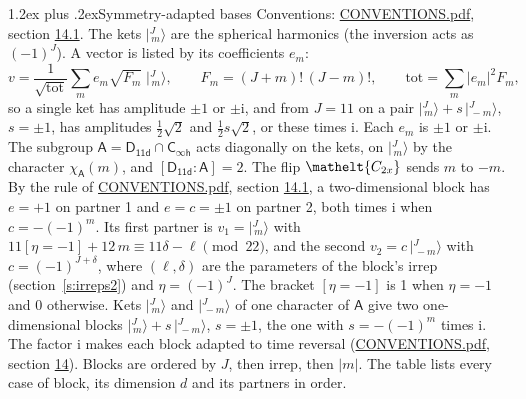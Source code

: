 \documentclass[10pt,a4paper]{article}
\makeatletter
\renewcommand\section{\@startsection{section}{1}{\z@}{-3ex plus -1ex minus -.2ex}%
  {1.2ex plus .2ex}{\normalfont\large\sffamily\bfseries\color{parttitle}}}
\numberwithin{equation}{section}
\newcommand{\eltfont}[1]{{\let\sigma\eltsigma\mathelt{#1}}}
\newcommand{\grp}[1]{\mathsf{#1}}
\newcommand{\elt}[1]{\eltfont{#1}}
\newcommand{\grpindex}[2]{[#1 : #2]}
\newcommand{\iverson}[1]{[#1]}
\newcommand{\iunit}{\mathrm{i}}
\newcommand{\chiA}{\chi_{\grp{A}}}
\newcommand{\jm}[2]{\bigl\lvert{}^{#1}_{\,#2}\bigr\rangle}
\makeatother
\begin{document}
\section{Symmetry-adapted bases}\label{s:bases}
Conventions: \href{../../CONVENTIONS.pdf}{CONVENTIONS.pdf}, section \href{../../CONVENTIONS.pdf\#conv.14.1}{14.1}.
\leavevmode\label{n:index.m}\label{n:vector.ket}The kets $\jm{J}{m}$ are the spherical harmonics (the inversion acts as $(-1)^J$). \label{n:index.ketcoefficient}\label{n:vector.basis.symmetry}\label{n:index.ketweight}\label{n:index.total}A vector is listed by its coefficients $e_m$:
\begin{equation}\label{e:ket}v = \frac{1}{\sqrt{\mathrm{tot}}}\sum_m e_m\sqrt{F_m}\;\jm{J}{m},\qquad F_m = (J+m)!\,(J-m)!,\qquad \mathrm{tot} = \sum_m |e_m|^2F_m,\end{equation}
\leavevmode\label{n:index.pair.sign}so a single ket has amplitude $\pm1$ or $\pm\iunit$, and from $J = 11$ on a pair $\jm{J}{m} + s\,\jm{J}{-m}$, $s = \pm1$, has amplitudes $\tfrac{1}{2}\sqrt{2}$ and $\tfrac{1}{2}s\sqrt{2}$, or these times $\iunit$. Each $e_m$ is $\pm1$ or $\pm\iunit$.
\leavevmode\label{n:group.A}\label{n:function.character.abelian}The subgroup $\grp{A} = \grp{D_{11d}}\cap\grp{C_{\infty h}}$ acts diagonally on the kets, on $\jm{J}{m}$ by the character $\chiA(m)$, and $\grpindex{\grp{D_{11d}}}{\grp{A}} = 2$. The flip $\elt{C_{2x}}$ sends $m$ to $-m$. \label{n:index.partner.sign}By the rule of \href{../../CONVENTIONS.pdf}{CONVENTIONS.pdf}, section \href{../../CONVENTIONS.pdf\#conv.14.1}{14.1}, a two-dimensional block has $e = +1$ on partner 1 and $e = c = \pm1$ on partner 2, both times $\iunit$ when $c = -(-1)^m$. \label{n:index.eta}Its first partner is $v_1 = \jm{J}{m}$ with $11\iverson{\eta = -1} + 12\,m \equiv 11\delta - \ell \pmod{22}$, and the second $v_2 = c\,\jm{J}{-m}$ with $c = (-1)^{J+\delta}$, where $(\ell, \delta)$ are the parameters of the block's irrep (section~\ref{s:irreps2}) and $\eta = (-1)^J$. The bracket $\iverson{\eta = -1}$ is 1 when $\eta = -1$ and 0 otherwise. Kets $\jm{J}{m}$ and $\jm{J}{-m}$ of one character of $\grp{A}$ give two one-dimensional blocks $\jm{J}{m} + s\,\jm{J}{-m}$, $s = \pm1$, the one with $s = -(-1)^m$ times $\iunit$. The factor $\iunit$ makes each block adapted to time reversal (\href{../../CONVENTIONS.pdf}{CONVENTIONS.pdf}, section \href{../../CONVENTIONS.pdf\#conv.14}{14}). Blocks are ordered by $J$, then irrep, then $|m|$.
\leavevmode\label{n:head.case}\label{n:head.partners}The table lists every case of block, its dimension $d$ and its partners in order.
\end{document}

